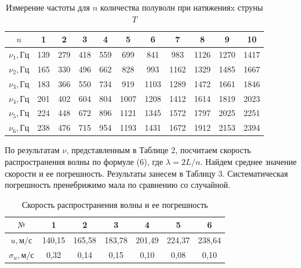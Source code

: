 \documentclass[a4paper,12pt]{article} %
\begin{document}
\begin{table}[h]
\centering
\begin{tabular}{|c|c|c|c|c|c|c|c|c|c|c|}
\hline
$n$ & 1 & 2 & 3 & 4 & 5 & 6 & 7 & 8 & 9 & 10\\ \hline
$\nu_1, \text{Гц}$ & 139 & 279 & 418 & 559 & 699 & 841 & 983 & 1126 & 1270 & 1417\\ \hline
$\nu_2, \text{Гц}$ & 165 & 330 & 496 & 662 & 828 & 993 & 1162 & 1329 & 1485 & 1667\\ \hline
$\nu_3, \text{Гц}$ & 183 & 366 & 550 & 734 & 919 & 1103 & 1289 & 1472 & 1661 & 1846\\ \hline
$\nu_4, \text{Гц}$ & 201 & 402 & 604 & 804 & 1007 & 1208 & 1412 & 1614 & 1819 & 2023 \\ \hline
$\nu_5, \text{Гц}$ & 224 & 448 & 672 & 896 & 1121 & 1345 & 1572 & 1797 & 2025 & 2251\\ \hline
$\nu_6, \text{Гц}$ & 238 & 476 & 715 & 954 & 1193 & 1431 & 1672 & 1912 & 2153 & 2394\\ \hline
\end{tabular}
\caption{Измерение частоты для $n$ количества полуволн при натяженияx струны $T$}
\end{table}
По результатам $\nu$, представленным в Таблице 2, посчитаем скорость распространения волны по формуле (6), где $\lambda=2L/n$. Найдем среднее значение скорости и ее погрешность. Результаты занесем в  Таблицу 3. Систематическая погрешность пренебрижимо мала по сравнению со случайной.
\begin{table}[h]
\centering
\begin{tabular}{|c|c|c|c|c|c|c|}
\hline
$\text{№}$ & 1 & 2 & 3 & 4 & 5 & 6\\ \hline
$u, \text{м/с}$ & 140,15 & 165,58 & 183,78 & 201,49 & 224,37 & 238,64\\ \hline
$\sigma_u, \text{м/с}$ & 0,32 & 0,14 & 0,15 & 0,10 & 0,08 & 0,10\\ \hline
\end{tabular}
\caption{Скорость распространения волны и ее погрешность}
\end{table}
\end{document}
